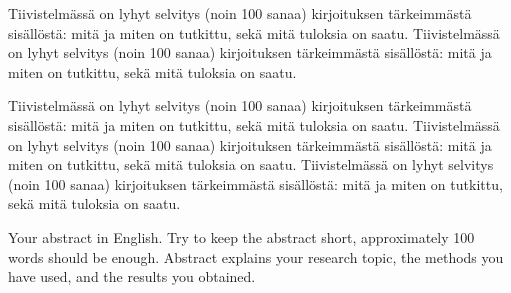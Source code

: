 \documentclass[finnish,12pt,a4paper,pdftex]{article}
\begin{document}


\makecoverpage


\begin{abstractpage}[finnish]
  Tiivistelmässä on lyhyt selvitys (noin 100 sanaa)
  kirjoituksen tärkeimmästä sisällöstä: mitä ja miten on tutkittu,
  sekä mitä tuloksia on saatu. 
  Tiivistelmässä on lyhyt selvitys (noin 100 sanaa)
  kirjoituksen tärkeimmästä sisällöstä: mitä ja miten on tutkittu,
  sekä mitä tuloksia on saatu. 

  Tiivistelmässä on lyhyt selvitys (noin 100 sanaa)
  kirjoituksen tärkeimmästä sisällöstä: mitä ja miten on tutkittu,
  sekä mitä tuloksia on saatu. 
  Tiivistelmässä on lyhyt selvitys (noin 100 sanaa)
  kirjoituksen tärkeimmästä sisällöstä: mitä ja miten on tutkittu,
  sekä mitä tuloksia on saatu. 
  Tiivistelmässä on lyhyt selvitys (noin 100 sanaa)
  kirjoituksen tärkeimmästä sisällöstä: mitä ja miten on tutkittu,
  sekä mitä tuloksia on saatu. 
\end{abstractpage}

\newpage
%
\keywords{}
\begin{abstractpage}[english]
 Your abstract in English. Try to keep the abstract short, approximately 
 100 words should be enough. Abstract explains your research topic, 
 the methods you have used, and the results you obtained.  
\end{abstractpage}
\end{document}
